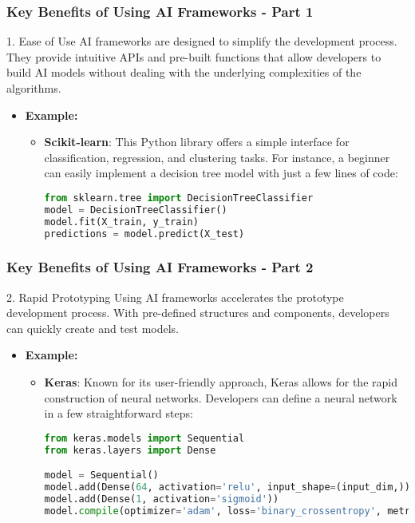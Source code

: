 \documentclass{beamer}
\begin{document}
\begin{frame}[fragile]
    \frametitle{Key Benefits of Using AI Frameworks - Part 1}
    \begin{block}{1. Ease of Use}
        AI frameworks are designed to simplify the development process. They provide intuitive APIs and pre-built functions that allow developers to build AI models without dealing with the underlying complexities of the algorithms.
        
        \begin{itemize}
            \item \textbf{Example:}
            \begin{itemize}
                \item \textbf{Scikit-learn}: This Python library offers a simple interface for classification, regression, and clustering tasks. For instance, a beginner can easily implement a decision tree model with just a few lines of code:
                \begin{lstlisting}[language=Python]
from sklearn.tree import DecisionTreeClassifier
model = DecisionTreeClassifier()
model.fit(X_train, y_train)
predictions = model.predict(X_test)
                \end{lstlisting}
            \end{itemize}
        \end{itemize}
    \end{block}
\end{frame}

\begin{frame}[fragile]
    \frametitle{Key Benefits of Using AI Frameworks - Part 2}
    \begin{block}{2. Rapid Prototyping}
        Using AI frameworks accelerates the prototype development process. With pre-defined structures and components, developers can quickly create and test models.
        
        \begin{itemize}
            \item \textbf{Example:}
            \begin{itemize}
                \item \textbf{Keras}: Known for its user-friendly approach, Keras allows for the rapid construction of neural networks. Developers can define a neural network in a few straightforward steps:
                \begin{lstlisting}[language=Python]
from keras.models import Sequential
from keras.layers import Dense

model = Sequential()
model.add(Dense(64, activation='relu', input_shape=(input_dim,)))
model.add(Dense(1, activation='sigmoid'))
model.compile(optimizer='adam', loss='binary_crossentropy', metrics=['accuracy'])
                \end{lstlisting}
            \end{itemize}
        \end{itemize}
    \end{block}
\end{frame}
\end{document}
